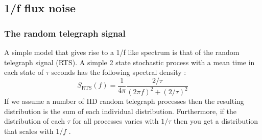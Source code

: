 \subsection{1/f flux noise}
\subsubsection*{The random telegraph signal}
A simple model that gives rise to a 1/f like spectrum is that of the random telegraph signal (RTS). A simple 2 state stochastic process with a mean time in each state of $\tau $ seconds has the following spectral density \cite{fluxNoiseSquidsStevenAnton}: 
\begin{equation}
    S_{\text{RTS}}(f) = \frac{1}{4\pi}\frac{2/\tau}{(2\pi f)^2+(2/\tau)^2}
    \label{eq:RTSPSD}
\end{equation}
If we assume a number of IID random telegraph processes then the resulting distribution is the sum of each individual distribution. Furthermore, if the distribution of each $\tau$ for all processes varies with $1/\tau$ then you get a distribution that scales with $1/f$ \cite{fluxNoiseSquidsStevenAnton}. 

